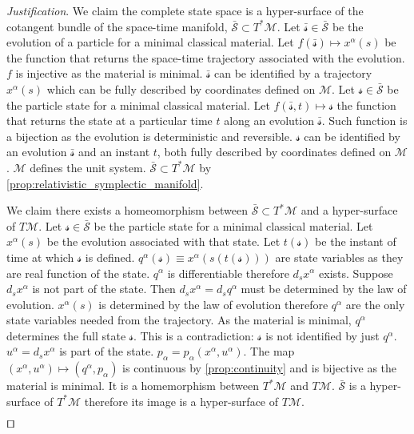 \documentclass[smallextended]{svjour3}
\numberwithin{equation}{section}
\newenvironment{justification}{\emph{Justification}.}{\hfill\(\qed\)}
\theoremstyle{definition}
\newenvironment{justification}{\emph{Justification}.}{\qed}
\begin{document}
\begin{justification}
	We claim the complete state space is a hyper-surface of the cotangent bundle of the space-time manifold, $\bar{\mathcal{S}} \subset T^*\mathcal{M}$. Let $\bar{\mathcal{s}} \in \bar{\mathcal{S}}$ be the evolution of a particle for a minimal classical material. Let $f(\bar{\mathcal{s}}) \mapsto x^\alpha(s)$ be the function that returns the space-time trajectory associated with the evolution. $f$ is injective as the material is minimal. $\bar{\mathcal{s}}$ can be identified by a trajectory $x^\alpha(s)$ which can be fully described by coordinates defined on $\mathcal{M}$. Let $\mathcal{s} \in \bar{\mathcal{S}}$ be the particle state for a minimal classical material. Let $f(\bar{\mathcal{s}}, t) \mapsto \mathcal{s}$ the function that returns the state at a particular time $t$ along an evolution $\bar{\mathcal{s}}$. Such function is a bijection as the evolution is deterministic and reversible. $\mathcal{s}$ can be identified by an evolution $\bar{\mathcal{s}}$ and an instant $t$, both fully described by coordinates defined on $\mathcal{M}$. $\mathcal{M}$ defines the unit system. $\bar{\mathcal{S}} \subset T^*\mathcal{M}$ by \ref{prop:relativistic_symplectic_manifold}.
	
	We claim there exists a homeomorphism between $\bar{\mathcal{S}} \subset T^*\mathcal{M}$ and a hyper-surface of $T\mathcal{M}$. Let $\mathcal{s} \in \bar{\mathcal{S}}$ be the particle state for a minimal classical material. Let $x^\alpha(s)$ be the evolution associated with that state. Let $t(\mathcal{s})$ be the instant of time at which $\mathcal{s}$ is defined. $q^\alpha(\mathcal{s}) \equiv x^\alpha(s(t(\mathcal{s})))$ are state variables as they are real function of the state. $q^\alpha$ is differentiable therefore $d_s x^\alpha$ exists. Suppose $d_s x^\alpha$ is not part of the state. Then $d_s x^\alpha = d_s q^\alpha$ must be determined by the law of evolution. $x^\alpha(s)$ is determined by the law of evolution therefore $q^\alpha$ are the only state variables needed from the trajectory. As the material is minimal, $q^\alpha$ determines the full state $\mathcal{s}$. This is a contradiction: $\mathcal{s}$ is not identified by just $q^\alpha$. $u^\alpha=d_s x^\alpha$ is part of the state. $p_\alpha = p_\alpha(x^\alpha, u^\alpha)$. The map $(x^\alpha, u^\alpha) \mapsto (q^\alpha, p_\alpha)$ is continuous by \ref{prop:continuity} and is bijective as the material is minimal. It is a homemorphism between $T^*\mathcal{M}$ and $T\mathcal{M}$. $\bar{\mathcal{S}}$ is a hyper-surface of $T^*\mathcal{M}$ therefore its image is a hyper-surface of $T\mathcal{M}$.
	

\end{justification}
\end{document}
